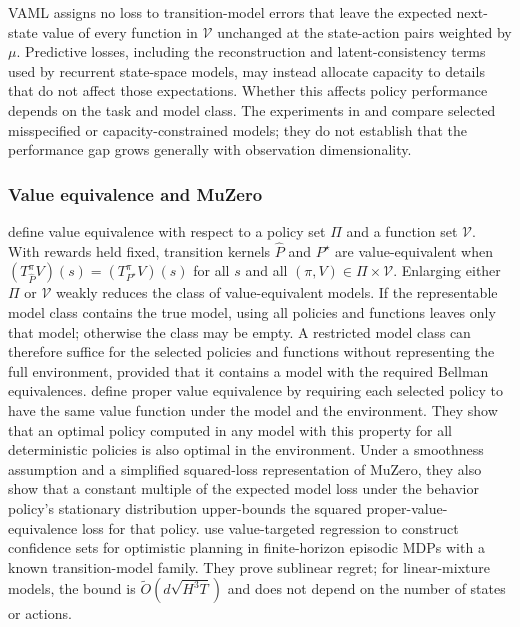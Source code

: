 VAML assigns no loss to transition-model errors that leave the expected next-state value of every function in $\mathcal{V}$ unchanged at the state-action pairs weighted by $\mu$. Predictive losses, including the reconstruction and latent-consistency terms used by recurrent state-space models, may instead allocate capacity to details that do not affect those expectations. Whether this affects policy performance depends on the task and model class. The experiments in \citet{FarahmandVAML2017} and \citet{GrimmVALEQ2020} compare selected misspecified or capacity-constrained models; they do not establish that the performance gap grows generally with observation dimensionality.

\subsubsection{Value equivalence and MuZero}
\label{section:fc_value_aware_ve}

\citet{GrimmVALEQ2020} define value equivalence with respect to a policy set $\Pi$ and a function set $\mathcal{V}$. With rewards held fixed, transition kernels $\widehat P$ and $P^\star$ are value-equivalent when $(T^\pi_{\widehat P} V)(s) = (T^\pi_{P^\star} V)(s)$ for all $s$ and all $(\pi, V) \in \Pi \times \mathcal{V}$. Enlarging either $\Pi$ or $\mathcal{V}$ weakly reduces the class of value-equivalent models. If the representable model class contains the true model, using all policies and functions leaves only that model; otherwise the class may be empty. A restricted model class can therefore suffice for the selected policies and functions without representing the full environment, provided that it contains a model with the required Bellman equivalences. \citet{GrimmPVE2021} define proper value equivalence by requiring each selected policy to have the same value function under the model and the environment. They show that an optimal policy computed in any model with this property for all deterministic policies is also optimal in the environment. Under a smoothness assumption and a simplified squared-loss representation of MuZero, they also show that a constant multiple of the expected model loss under the behavior policy's stationary distribution upper-bounds the squared proper-value-equivalence loss for that policy. \citet{AyoubVTR2020} use value-targeted regression to construct confidence sets for optimistic planning in finite-horizon episodic MDPs with a known transition-model family. They prove sublinear regret; for linear-mixture models, the bound is $\widetilde O(d\sqrt{H^3T})$ and does not depend on the number of states or actions.

